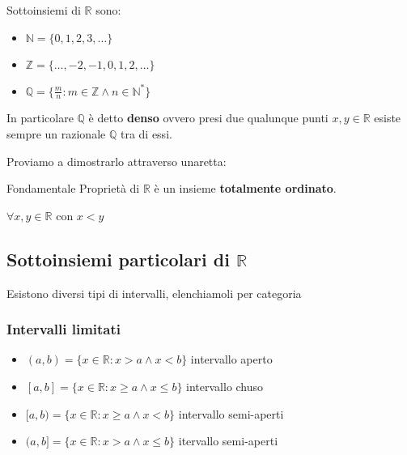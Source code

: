 \documentclass[../main.tex, class=article, 12pt]{subfiles}
\begin{document}
Sottoinsiemi di $ \mathbb{R} $ sono:
\begin{itemize}
        \item $ \mathbb{N} = \{0,1,2,3,\ldots\} $
        \item $ \mathbb{Z} = \{\ldots,-2,-1,0,1,2,\ldots\} $
        \item $ \mathbb{Q} = \{\frac{m}{n}: m \in \mathbb{Z} \wedge n \in \mathbb{N}^*\} $
\end{itemize}

\begin{tcolorbox}
       \begin{oss}
        In particolare $ \mathbb{Q} $ è detto \textbf{denso} ovvero  presi due qualunque punti $ x,y \in \mathbb{R} $ esiste sempre un razionale $ \mathbb{Q}  $ tra di essi.
       \end{oss} 
        \begin{exmp}
                Proviamo a dimostrarlo attraverso unaretta:
        \end{exmp}
\end{tcolorbox}


\begin{tcolorbox}
\begin{prop}
Fondamentale Proprietà di $ \mathbb{R} $ è un insieme \textbf{totalmente ordinato}.
\end{prop}
\end{tcolorbox}

\begin{lemma}
       $ \forall x,y \in \mathbb{R} $ con $ x < y $ 
\end{lemma}


\subsection{Sottoinsiemi particolari di $\mathbb{R}$}\label{sec:sottoinsiemi_particolari_di_R}

Esistono diversi tipi di intervalli, elenchiamoli per categoria


\subsubsection{Intervalli limitati}
\begin{itemize}
        \item $ (a,b) = \{x \in \mathbb{R} : x>a \wedge x<b\} $ intervallo aperto
        \item $ [a,b] = \{x \in \mathbb{R} : x\ge a \wedge x\le b\} $ intervallo chuso
        \item $ [a,b) = \{x \in \mathbb{R} : x\ge a \wedge x<b\} $ intervallo semi-aperti
        \item $ (a,b] = \{x \in \mathbb{R} : x>a \wedge x\le b\} $ itervallo semi-aperti
\end{itemize}
\end{document}

